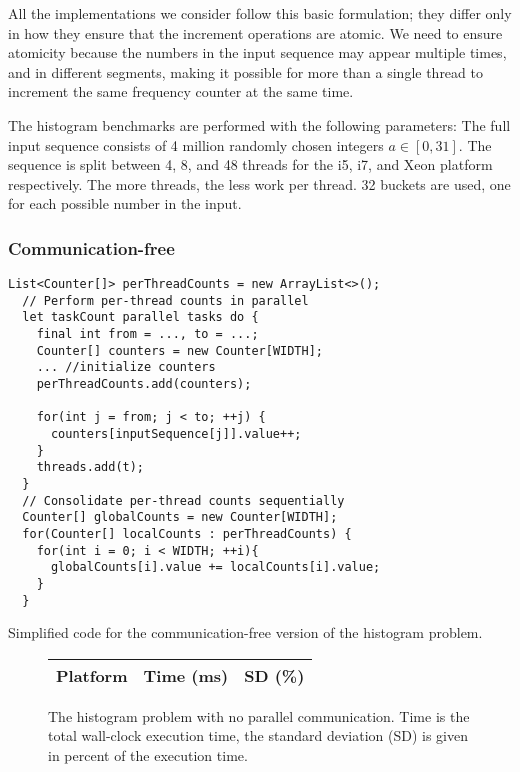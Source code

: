 All the implementations we consider follow this basic formulation; they differ
only in how they ensure that the increment operations are atomic. We need to
ensure atomicity because the numbers in the input sequence may appear multiple
times, and in different segments, making it possible for more than a single
thread to increment the same frequency counter at the same time.

The histogram benchmarks are performed with the following parameters: The full
input sequence consists of 4 million randomly chosen integers $a\in[0,31]$. The
sequence is split between 4, 8, and 48 threads for the i5, i7, and Xeon platform
respectively. The more threads, the less work per thread. 32 buckets are used,
one for each possible number in the input.

\subsubsection{Communication-free}
\begin{code}
\begin{Verbatim}[frame=single]
  List<Counter[]> perThreadCounts = new ArrayList<>();
  // Perform per-thread counts in parallel
  let taskCount parallel tasks do {
    final int from = ..., to = ...;
    Counter[] counters = new Counter[WIDTH];
    ... //initialize counters
    perThreadCounts.add(counters);

    for(int j = from; j < to; ++j) {
      counters[inputSequence[j]].value++;
    }
    threads.add(t);
  }
  // Consolidate per-thread counts sequentially
  Counter[] globalCounts = new Counter[WIDTH];
  for(Counter[] localCounts : perThreadCounts) {
    for(int i = 0; i < WIDTH; ++i){
      globalCounts[i].value += localCounts[i].value;
    }
  }
\end{Verbatim}
	\caption{Simplified code for the communication-free version of the
	histogram problem.}
\end{code}
\begin{figure}[hbtp]
	\centering
	\begin{tabular}{l r r}
		\hline
		\hline
		Platform & Time (ms) & SD (\%) \\
		\hline
		
		\hline
		\hline
	\end{tabular}
	\caption{The histogram problem with no parallel communication. Time is
	the total wall-clock execution time, the standard deviation (SD) is
	given in percent of the execution time.}
	\label{table:histo-lockfree}
\end{figure}


